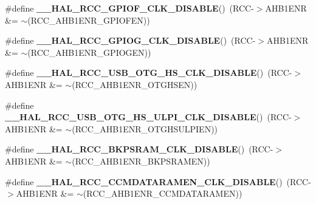 \begin{DoxyCompactItemize}
\item 
\#define {\bfseries \+\_\+\+\_\+\+H\+A\+L\+\_\+\+R\+C\+C\+\_\+\+G\+P\+I\+O\+F\+\_\+\+C\+L\+K\+\_\+\+D\+I\+S\+A\+B\+LE}()~(R\+CC-\/$>$A\+H\+B1\+E\+NR \&= $\sim$(R\+C\+C\+\_\+\+A\+H\+B1\+E\+N\+R\+\_\+\+G\+P\+I\+O\+F\+EN))\hypertarget{group___r_c_c_ex___exported___macros_ga84c2248eab0a30bd8f4912233abbf34a}{}\label{group___r_c_c_ex___exported___macros_ga84c2248eab0a30bd8f4912233abbf34a}

\item 
\#define {\bfseries \+\_\+\+\_\+\+H\+A\+L\+\_\+\+R\+C\+C\+\_\+\+G\+P\+I\+O\+G\+\_\+\+C\+L\+K\+\_\+\+D\+I\+S\+A\+B\+LE}()~(R\+CC-\/$>$A\+H\+B1\+E\+NR \&= $\sim$(R\+C\+C\+\_\+\+A\+H\+B1\+E\+N\+R\+\_\+\+G\+P\+I\+O\+G\+EN))\hypertarget{group___r_c_c_ex___exported___macros_ga9d4578e9566823639e049fe69cbaba69}{}\label{group___r_c_c_ex___exported___macros_ga9d4578e9566823639e049fe69cbaba69}

\item 
\#define {\bfseries \+\_\+\+\_\+\+H\+A\+L\+\_\+\+R\+C\+C\+\_\+\+U\+S\+B\+\_\+\+O\+T\+G\+\_\+\+H\+S\+\_\+\+C\+L\+K\+\_\+\+D\+I\+S\+A\+B\+LE}()~(R\+CC-\/$>$A\+H\+B1\+E\+NR \&= $\sim$(R\+C\+C\+\_\+\+A\+H\+B1\+E\+N\+R\+\_\+\+O\+T\+G\+H\+S\+EN))\hypertarget{group___r_c_c_ex___exported___macros_ga222a9bad41499b041c5dbd0e64e78a2d}{}\label{group___r_c_c_ex___exported___macros_ga222a9bad41499b041c5dbd0e64e78a2d}

\item 
\#define {\bfseries \+\_\+\+\_\+\+H\+A\+L\+\_\+\+R\+C\+C\+\_\+\+U\+S\+B\+\_\+\+O\+T\+G\+\_\+\+H\+S\+\_\+\+U\+L\+P\+I\+\_\+\+C\+L\+K\+\_\+\+D\+I\+S\+A\+B\+LE}()~(R\+CC-\/$>$A\+H\+B1\+E\+NR \&= $\sim$(R\+C\+C\+\_\+\+A\+H\+B1\+E\+N\+R\+\_\+\+O\+T\+G\+H\+S\+U\+L\+P\+I\+EN))\hypertarget{group___r_c_c_ex___exported___macros_ga0dab1b49a8c36801028f0d7dccd9aedd}{}\label{group___r_c_c_ex___exported___macros_ga0dab1b49a8c36801028f0d7dccd9aedd}

\item 
\#define {\bfseries \+\_\+\+\_\+\+H\+A\+L\+\_\+\+R\+C\+C\+\_\+\+B\+K\+P\+S\+R\+A\+M\+\_\+\+C\+L\+K\+\_\+\+D\+I\+S\+A\+B\+LE}()~(R\+CC-\/$>$A\+H\+B1\+E\+NR \&= $\sim$(R\+C\+C\+\_\+\+A\+H\+B1\+E\+N\+R\+\_\+\+B\+K\+P\+S\+R\+A\+M\+EN))\hypertarget{group___r_c_c_ex___exported___macros_ga99d6bde82e92bd4b7f45fde7fd0a6760}{}\label{group___r_c_c_ex___exported___macros_ga99d6bde82e92bd4b7f45fde7fd0a6760}

\item 
\#define {\bfseries \+\_\+\+\_\+\+H\+A\+L\+\_\+\+R\+C\+C\+\_\+\+C\+C\+M\+D\+A\+T\+A\+R\+A\+M\+E\+N\+\_\+\+C\+L\+K\+\_\+\+D\+I\+S\+A\+B\+LE}()~(R\+CC-\/$>$A\+H\+B1\+E\+NR \&= $\sim$(R\+C\+C\+\_\+\+A\+H\+B1\+E\+N\+R\+\_\+\+C\+C\+M\+D\+A\+T\+A\+R\+A\+M\+EN))\hypertarget{group___r_c_c_ex___exported___macros_ga37131287a1b1df836252787835787d65}{}\label{group___r_c_c_ex___exported___macros_ga37131287a1b1df836252787835787d65}


\end{DoxyCompactItemize}
